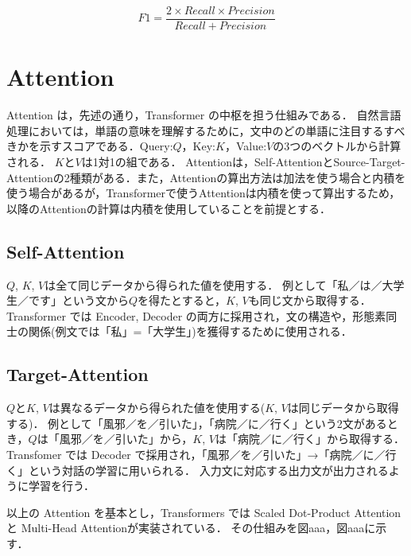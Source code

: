 $$
F1 = \frac{2 \times Recall \times Precision}{Recall+Precision}
$$


\section{Attention \label{c4s3}}
Attention は，先述の通り，Transformer の中枢を担う仕組みである．
自然言語処理においては，単語の意味を理解するために，文中のどの単語に注目するすべきかを示すスコアである．Query:${Q}$，Key:${K}$，Value:${V}$の3つのベクトルから計算される．
${K}$と${V}$は1対1の組である．
Attentionは，Self-AttentionとSource-Target-Attentionの2種類がある．また，Attentionの算出方法は加法を使う場合と内積を使う場合があるが，Transformerで使うAttentionは内積を使って算出するため，以降のAttentionの計算は内積を使用していることを前提とする．

\subsection{Self-Attention \label{c4s3-1a}}
${Q}$, ${K}$, ${V}$は全て同じデータから得られた値を使用する．
例として「私／は／大学生／です」という文から${Q}$を得たとすると，${K}$, ${V}$も同じ文から取得する．Transformer では Encoder, Decoder の両方に採用され，文の構造や，形態素同士の関係(例文では「私」=「大学生」)を獲得するために使用される．

\subsection{Target-Attention \label{c4s3-1b}}
${Q}$と${K}$, ${V}$は異なるデータから得られた値を使用する(${K}$, ${V}$は同じデータから取得する)．
例として「風邪／を／引いた」，「病院／に／行く」という2文があるとき，${Q}$は「風邪／を／引いた」から，${K}$, ${V}$は「病院／に／行く」から取得する．
 Transfomer では Decoder で採用され，「風邪／を／引いた」→「病院／に／行く」という対話の学習に用いられる．
入力文に対応する出力文が出力されるように学習を行う．

以上の Attention を基本とし，Transformers では Scaled Dot-Product Attention と Multi-Head Attentionが実装されている．
その仕組みを図aaa，図aaaに示す．



